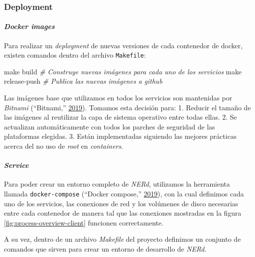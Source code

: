 \documentclass[12pt,a4paper,]{scrartcl}
\newenvironment{Shaded}{\begin{snugshade}}{\end{snugshade}}
\newcommand{\CommentTok}[1]{\textcolor[rgb]{0.56,0.35,0.01}{\textit{#1}}}
\newcommand{\FunctionTok}[1]{\textcolor[rgb]{0.00,0.00,0.00}{#1}}
\newcommand{\NormalTok}[1]{#1}
\let\oldparagraph\paragraph
\renewcommand{\paragraph}[1]{\oldparagraph{#1}\mbox{}}
\begin{document}
\hypertarget{deployment}{%
\subsubsection{Deployment}\label{deployment}}

\hypertarget{docker-images}{%
\paragraph{\texorpdfstring{\emph{Docker images}}{Docker images}}\label{docker-images}}

Para realizar un \emph{deployment} de nuevas versiones de cada contenedor de docker, existen comandos dentro del archivo \texttt{Makefile}:

\begin{Shaded}
\begin{Highlighting}[]
\FunctionTok{make}\NormalTok{ build }\CommentTok{# Construye nuevas imágenes para cada uno de los servicios}
\FunctionTok{make}\NormalTok{ release-push }\CommentTok{# Publica las nuevas imágenes a github}
\end{Highlighting}
\end{Shaded}

Las imágenes base que utilizamos en todos los servicios son mantenidas por \emph{Bitnami} (``Bitnami,'' \protect\hyperlink{ref-bitnami}{2019}). Tomamos esta decisión para:
1. Reducir el tamaño de las imágenes al reutilizar la capa de sistema operativo entre todas ellas.
2. Se actualizan automáticamente con todos los parches de seguridad de las plataformas elegidas.
3. Están implementadas siguiendo las mejores prácticas acerca del no uso de \emph{root} en \emph{containers}.

\hypertarget{service}{%
\paragraph{\texorpdfstring{\emph{Service}}{Service}}\label{service}}

Para poder crear un entorno completo de \emph{NERd}, utilizamos la herramienta llamada \texttt{docker-compose} (``Docker compose,'' \protect\hyperlink{ref-dockercompose}{2019}), con la cual definimos cada uno de los servicios, las conexiones de red y los volúmenes de disco necesarias entre cada contenedor de manera tal que las conexiones mostradas en la figura \ref{fig:process-overview-client} funcionen correctamente.

A su vez, dentro de un archivo \emph{Makefile} del proyecto definimos un conjunto de comandos que sirven para crear un entorno de desarrollo de \emph{NERd}.
\end{document}
